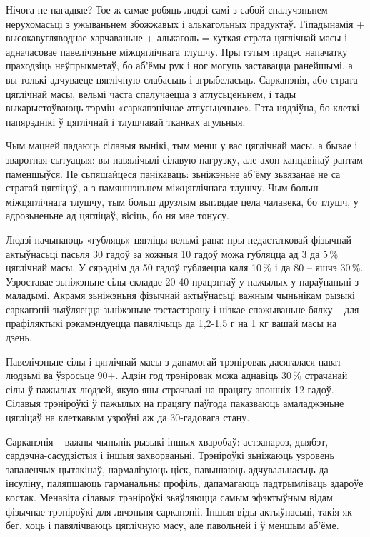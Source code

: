 Нічога не нагадвае? Тое ж самае робяць людзі самі з сабой спалучэньнем нерухомасьці з ужываньнем збожжавых і алькагольных прадуктаў. Гіпадынамія + высокавугляводнае харчаваньне + алькаголь = хуткая страта цяглічнай масы і адначасовае павелічэньне міжцяглічнага тлушчу. Пры гэтым працэс напачатку праходзіць неўпрыкметаў, бо аб'ёмы рук і ног могуць заставацца ранейшымі, а вы толькі адчуваеце цяглічную слабасьць і згрыбеласьць. Саркапэнія, або страта цяглічнай масы, вельмі часта спалучаецца з атлусьценьнем, і тады выкарыстоўваюць тэрмін «саркапэнічнае атлусьценьне». Гэта нядзіўна, бо клеткі-папярэднікі ў цяглічнай і тлушчавай тканках агульныя.

Чым мацней падаюць сілавыя вынікі, тым менш у вас цяглічнай масы, а бывае і зваротная сытуацыя: вы павялічылі сілавую нагрузку, але ахоп канцавінаў раптам паменшыўся. Не сьпяшайцеся панікаваць: зьніжэньне аб'ёму зьвязанае не са стратай цягліцаў, а з памяншэньнем міжцяглічнага тлушчу. Чым больш міжцяглічнага тлушчу, тым больш друзлым выглядае цела чалавека, бо тлушч, у адрозьненьне ад цягліцаў, вісіць, бо ня мае тонусу.

Людзі пачынаюць «губляць» цягліцы вельмі рана: пры недастатковай фізычнай актыўнасьці пасьля 30 гадоў за кожныя 10 гадоў можа губляцца ад 3 да 5\,\% цяглічнай масы. У сярэднім да 50 гадоў губляецца каля 10\,\% і да 80 – яшчэ 30\,\%. Узроставае зьніжэньне сілы складае 20-40 працэнтаў у пажылых у параўнаньні з маладымі. Акрамя зьніжэньня фізычнай актыўнасьці важным чыньнікам рызыкі саркапэніі зьяўляецца зьніжэньне тэстастэрону і нізкае спажываньне бялку – для прафіляктыкі рэкамэндуецца павялічыць да 1,2-1,5 г на 1 кг вашай масы на дзень.

Павелічэньне сілы і цяглічнай масы з дапамогай трэніровак дасягалася нават людзьмі ва ўзросьце 90+. Адзін год трэніровак можа аднавіць 30\,\% страчанай сілы ў пажылых людзей, якую яны страчвалі на працягу апошніх 12 гадоў. Сілавыя трэніроўкі ў пажылых на працягу паўгода паказваюць амаладжэньне цягліцаў на клеткавым узроўні аж да 30-гадовага стану.

Саркапэнія – важны чыньнік рызыкі іншых хваробаў: астэапароз, дыябэт, сардэчна-сасудзістыя і іншыя захворваньні. Трэніроўкі зьніжаюць узровень запаленчых цытакінаў, нармалізуюць ціск, павышаюць адчувальнасьць да інсуліну, паляпшаюць гарманальны профіль, дапамагаюць падтрымліваць здароўе костак. Менавіта сілавыя трэніроўкі зьяўляюцца самым эфэктыўным відам фізычнае трэніроўкі для лячэньня саркапэніі. Іншыя віды актыўнасьці, такія як бег, хоць і павялічваюць цяглічную масу, але павольней і ў меншым аб'ёме.

